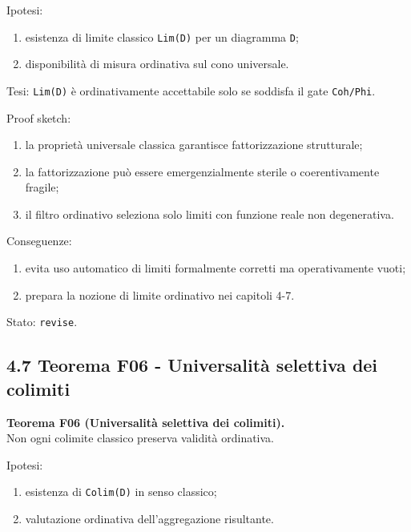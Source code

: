 Ipotesi:

\begin{enumerate}
\def\labelenumi{\arabic{enumi}.}
\tightlist
\item
  esistenza di limite classico \texttt{Lim(D)} per un diagramma \texttt{D};
\item
  disponibilità di misura ordinativa sul cono universale.
\end{enumerate}

Tesi:
\texttt{Lim(D)} è ordinativamente accettabile solo se soddisfa il gate \texttt{Coh/Phi}.

Proof sketch:

\begin{enumerate}
\def\labelenumi{\arabic{enumi}.}
\tightlist
\item
  la proprietà universale classica garantisce fattorizzazione strutturale;
\item
  la fattorizzazione può essere emergenzialmente sterile o coerentivamente fragile;
\item
  il filtro ordinativo seleziona solo limiti con funzione reale non degenerativa.
\end{enumerate}

Conseguenze:

\begin{enumerate}
\def\labelenumi{\arabic{enumi}.}
\tightlist
\item
  evita uso automatico di limiti formalmente corretti ma operativamente vuoti;
\item
  prepara la nozione di limite ordinativo nei capitoli 4-7.
\end{enumerate}

Stato: \texttt{revise}.

\subsection{4.7 Teorema F06 - Universalità selettiva dei colimiti}

\textbf{Teorema F06 (Universalità selettiva dei colimiti).}\\
Non ogni colimite classico preserva validità ordinativa.

Ipotesi:

\begin{enumerate}
\def\labelenumi{\arabic{enumi}.}
\tightlist
\item
  esistenza di \texttt{Colim(D)} in senso classico;
\item
  valutazione ordinativa dell'aggregazione risultante.
\end{enumerate}

